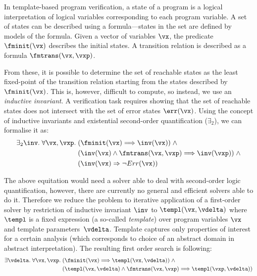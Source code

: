 {In template-based program verification, 
a state of a program is a logical interpretation of logical variables
corresponding to each program variable. A set of states can be described using
a formula---states in the set are defined by models of the formula. Given a
vector of variables $\vx$, the predicate $\fminit(\vx)$ describes
the initial states. A transition relation is described as a formula
$\fmtrans(\vx, \vxp)$.

From these, it is possible to determine the set of reachable states as the
least fixed-point of the transition relation starting from the states described
by $\fminit(\vx)$. This is, however, difficult to compute, so instead, we use an
\emph{inductive invariant}.
A verification task requires showing that the set of reachable
states does not intersect with the set of error states $\err(\vx)$.
Using the concept of inductive invariants and  existential second-order
quantification ($\exists_2$), we can formalise it as:
\begin{equation}\label{eq:2ls}
\begin{split}
\exists_2 \inv . \; \forall \vx, \vxp . \; 
& (\fminit(\vx) \Longrightarrow \inv(\vx)) \; \wedge \\ 
& (\inv(\vx) \wedge \fmtrans(\vx,\vxp) \Longrightarrow \inv(\vxp)) \; \wedge \\
& (\inv(\vx) \Rightarrow \neg Err(\vx))
\end{split}
\end{equation}

The above equitation would need a solver able to deal with second-order logic quantification,
however, there are currently no general and efficient solvers able to do it.
Therefore we reduce the problem to iterative application of a first-order solver
by restriction of inductive invariant $\inv$ to $\templ(\vx, \vdelta)$ where $\templ$ is
a fixed expression (a so-called \emph{template}) over program
variables $\vx$ and template parameters~$\vdelta$.
Template captures only properties of interest for a certain analysis (which corresponds
to choice of an abstract domain in abstract interpretation).
The resulting first order search is following:
\begin{equation}\label{eq:formula-templates}
\begin{split}
\exists \vdelta . \; \forall \vx, \vxp . \; & 
(\fminit(\vx) \Longrightarrow \templ(\vx, \vdelta)) \; \wedge \\ 
& (\templ(\vx, \vdelta) \wedge \fmtrans(\vx,\vxp) \Longrightarrow 
\templ(\vxp, \vdelta))
\end{split}
\end{equation}

}
